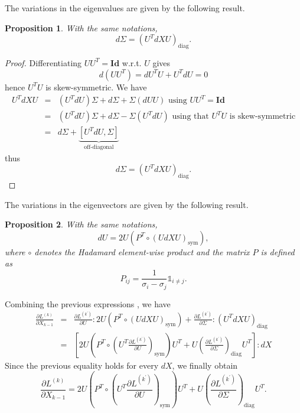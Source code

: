\documentclass[10pt,a4paper]{book}
\theoremstyle{definition}
\theoremstyle{plain}
\newtheorem{prop}{Proposition}[section]
\theoremstyle{remark}
\newcommand{\Id}{\mathrm{\textbf{Id}}}
\begin{document}
The variations in the eigenvalues are given by the following result.
\begin{prop}
With the same notations,
$$d\Sigma=(U^T dX U)_{\text{diag}}.$$
\end{prop}
\begin{proof}
Differentiating $UU^T=\Id$ w.r.t. $U$ gives
$$d(UU^T)=dU^T U +U^T dU =0$$
hence $U^T U$ is skew-symmetric. 
We have 
\begin{eqnarray*}
    U^T dX U&=& (U^T dU)\Sigma +d\Sigma +\Sigma (dU U)\text{  using } UU^T = \Id\\
    &=& (U^T dU)\Sigma +d\Sigma -\Sigma(U^T dU) \text{  using that } U^TU \text{ is skew-symmetric}\\
    &=&d\Sigma+\underbrace{[U^TdU,\Sigma]}_{\text{off-diagonal}}
\end{eqnarray*}
thus
$$d\Sigma=(U^T dX U)_{\text{diag}}.$$
\end{proof}

The variations in the eigenvectors are given by the following result.
\begin{prop}
    With the same notations,
    $$dU=2U(P^T \circ (U dX U)_{\text{sym}}),$$
    where $\circ$ denotes the Hadamard element-wise product and the matrix $P$ is defined as
    $$P_{ij}=\frac{1}{\sigma_i-\sigma_j}\mathds{1}_{i\neq j}.$$
    \end{prop}
    
Combining the previous expressions , we have
\begin{eqnarray*}
    \frac{\partial{L^{(k)}}}{\partial X_{k-1}}&=&\frac{\partial L^{(k^{\prime})}}{\partial U}:2U(P^T \circ (U dX U)_{\text{sym}})+\frac{\partial L^{(k^{\prime})}}{\partial \Sigma}:(U^T dX U)_{\text{diag}}\\
    &=&\left [2U\left(P^T \circ \left(U^T \frac{\partial L^{(k^{\prime})}}{\partial U}\right)_{\text{sym}}\right)U^T+U\left (\frac{\partial L^{(k^{\prime})}}{\partial \Sigma} \right )_{\text{diag}} U^T\right ]: dX
\end{eqnarray*}
Since the previous equality holds for every $dX$, we finally obtain
$$\frac{\partial L^{(k)}}{\partial X_{k-1}}=2U(P^T \circ (U^T \frac{\partial L^{(k^{\prime})}}{\partial U})_{\text{sym}})U^T+U\left (\frac{\partial L^{(k^{\prime})}}{\partial \Sigma} \right )_{\text{diag}}U^T.$$
\end{document}

